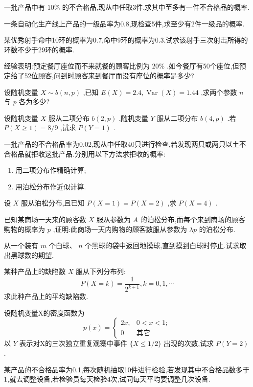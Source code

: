 \begin{xiti}
\item 一批产品中有 $ 10\% $ 的不合格品,现从中任取3件,求其中至多有一件不合格品的概率.
\item 一条自动化生产线上产品的一级品率为0.8,现检查5件,求至少有2件一级品的概率.
\item 某优秀射手命中10环的概率为0.7,命中9环的概率为0.3.试求该射手三次射击所得的环数不少于29环的概率.
\item 经验表明:预定餐厅座位而不来就餐的顾客比例为 $ 20\% $ .如今餐厅有50个座位,但预定给了52位顾客,问到时顾客来到餐厅而没有座位的概率是多少?
\item 设随机变量 $ X \sim b(n, p) $ ,已知 $ E(X)=2.4, \operatorname{Var}(X)=1.44 $ ,求两个参数 $ n $ 与 $ p $ 各为多少?
\item 设随机变量 $ X $ 服从二项分布 $ b(2,p) $ ,随机变量 $ Y $ 服从二项分布 $ b(4,p) $ .若 $ P(X \geqslant 1)=8/9 $ ,试求 $ P(Y=1) $ .
\item 一批产品的不合格品率为0.02,现从中任取40只进行检查,若发现两只或两只以土不合格品就拒收这批产品.分别用以下方法求拒收的概率:
\begin{enumerate}
	\item 用二项分布作精确计算;
	\item 用泊松分布作近似计算.
\end{enumerate}
\item 设 $ X $ 服从泊松分布,且已知 $ P(X=1)=P(X=2) $ ,求 $ P(X=4) $ .
\item 已知某商场一天来的顾客数 $ X $ 服从参数为 $ A $ 的泊松分布,而每个来到商场的顾客购物的概率为 $ p $ ,证明:此商场一天内购物的顾客数服从参数为 $ \lambda p $ 的泊松分布.
\item 从一个装有 $ m $ 个白球、 $ n $ 个黑球的袋中返回地摸球,直到摸到白球时停止.试求取出黑球数的期望.
\item 某种产品上的缺陷数 $ X $ 服从下列分布列:
\[
P(X=k)=\frac{1}{2^{k+1}}, k=0,1, \cdots
\]
求此种产品上的平均缺陷数.
\item 设随机变量X的密度函数为
\[
p(x)=\left\{
\begin{array}{ll}
{2 x,} & {0<x<1 ;} \\ 
{0}    & {\text{其它}}
\end{array}
\right.
\]
以 $ Y $ 表示对X的三次独立重复观寨中事件 $ \{X \leqslant 1 / 2\} $ 出现的次数,试求 $ P(Y=2) $ .
\item 某产品的不合格品率为0.1,每次随机抽取10件进行检验,若发现其中不合格品数多于1,就去调整设备,若检验员每天检验4次,试同每天平均要调整几次设备.
\end{xiti}

